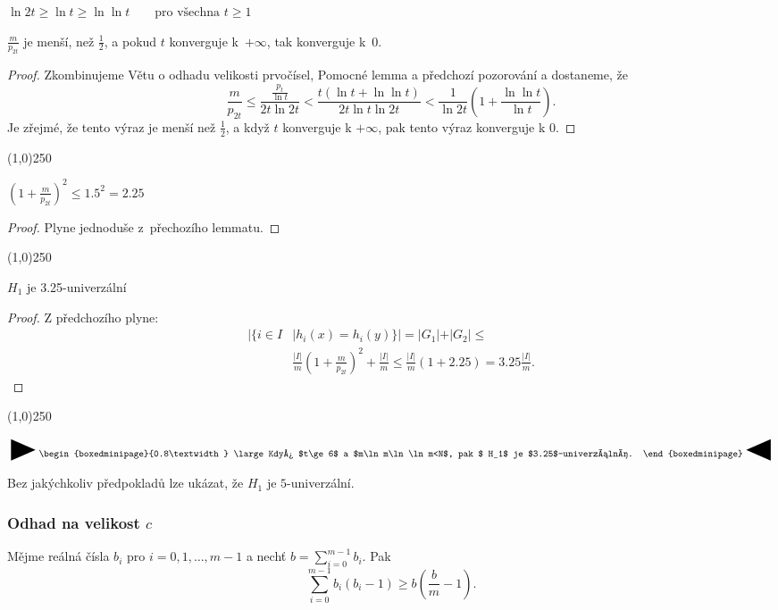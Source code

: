 \documentclass[a4paper,12pt]{article}
\newenvironment{myproof}{
  \begin{proof}
    
  }{
  \end{proof}
  \begin{center}
   \line(1,0){250}
   \end{center}
  }
\newcommand{\zapamatovat}[1]{
 {
 
 \setlength\fboxrule{5pt}
 \begin{center}
 $\vcenter{
 \hbox{\raisebox{-0.8ex}{\scalebox{1.7}{\Huge\RIGHTarrow}}\begin{boxedminipage}{0.8\textwidth}
\large #1
 \end{boxedminipage}\raisebox{-0.8ex}{\scalebox{1.7}{\Huge\LEFTarrow}}}}$
 \end{center}
 }
 }
\begin{document}
\begin{pozorovani}
$\ln2t\ge\ln t\ge\ln\ln t\qquad\text{pro všechna }t\ge 1$
\end{pozorovani}

\begin{lemma}
    $\frac m{p_{2t}}$ je menší, než $\frac 12$, a pokud $t$ konverguje k~$+\infty$, tak konverguje k~$0$.
\end{lemma}
\begin{myproof}
Zkombinujeme Větu o odhadu velikosti prvočísel, 
Pomocné lemma a předchozí pozorování 
a dostaneme, že
$$\frac m{p_{2t}}\le\frac {\frac {p_t}{\ln t}}{2t\ln2t}<\frac {t(\ln 
t+\ln\ln t)}{2t\ln t\ln2t}<\frac 1{\ln2t}(1+\frac {\ln\ln t}{\ln 
t}).$$
Je zřejmé, že tento výraz je menší než $\frac 
12$, 
a když $t$ konverguje k $+\infty$, pak tento výraz konverguje k $
0$.
\end{myproof}

\begin{lemma}
    $(1+\frac m{p_{2t}})^2\le 1.5^2=2.25$
\end{lemma} 
\begin{myproof}
    Plyne jednoduše z~přechozího lemmatu.
\end{myproof}

\begin{veta}
    $H_1$ je 3.25-univerzální
\end{veta}
\begin{myproof}
    Z předchozího plyne:
    \begin{align*}|\{i\in I&\mid h_i(x)=h_i(y)\}|=|G_1|+|G_2|\le\\
    &\frac {|I|}m(1+\frac m{p_{2t}})^2+\frac {|I|}m\le\frac {|I|}m(1+
    2.25)=3.25\frac {|I|}m.\end{align*}
\end{myproof}

\zapamatovat{
Když $t\ge 6$ a $m\ln m\ln\ln m<N$, pak $
H_1$ je 
$3.25$-univerzální. 
}

Bez jakýchkoliv předpokladů lze 
ukázat, že $H_1$ je $5$-univerzální.

\subsubsection{Odhad na velikost $c$}

\begin{lemma}Mějme reálná čísla $b_i$ pro $i=0,1
,\dots,m-1$ a 
nechť $b=\sum_{i=0}^{m-1}b_i$. Pak 
$$\sum_{i=0}^{m-1}b_i(b_i-1)\ge b(\frac bm-1).$$
\end{lemma}
\end{document}
